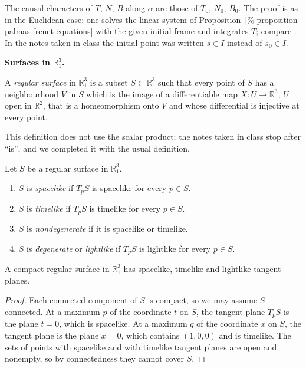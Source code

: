 The causal characters of $T$, $N$, $B$
along $\alpha$ are those of $T_0$, $N_0$,
$B_0$. The proof is as in the Euclidean
case: one solves the linear system of
Proposition~\ref{%
proposition-palmas-frenet-equations}
with the given initial frame and integrates
$T$; compare \cite[Theorems 2.6 and
2.8]{lopez2014differential}. In the notes
taken in class the initial point was
written $s\in I$ instead of $s_0\in I$.

\medskip\noindent
{\bf Surfaces in $\mathbb{R}^3_1$.}

\begin{definition}
\label{definition-palmas-regular-surface}
A \emph{regular surface} in
$\mathbb{R}^3_1$ is a subset
$S\subset\mathbb{R}^3$ such that every
point of $S$ has a neighbourhood $V$ in
$S$ which is the image of a differentiable
map $X\colon U\to\mathbb{R}^3$, $U$ open in
$\mathbb{R}^2$, that is a homeomorphism
onto $V$ and whose differential is
injective at every point.
\end{definition}

This definition does not use the scalar
product; the notes taken in class stop
after ``is'', and we completed it with the
usual definition.

\begin{definition}
\label{definition-palmas-causal-surface}
Let $S$ be a regular surface in
$\mathbb{R}^3_1$.
\begin{enumerate}
\item $S$ is \emph{spacelike} if $T_pS$ is
spacelike for every $p\in S$.
\item $S$ is \emph{timelike} if $T_pS$ is
timelike for every $p\in S$.
\item $S$ is \emph{nondegenerate} if it is
spacelike or timelike.
\item $S$ is \emph{degenerate} or
\emph{lightlike} if $T_pS$ is lightlike
for every $p\in S$.
\end{enumerate}
\end{definition}

\begin{proposition}
\label{proposition-palmas-compact-surface}
A compact regular surface in
$\mathbb{R}^3_1$ has spacelike, timelike
and lightlike tangent planes.
\end{proposition}

\begin{proof}
Each connected component of $S$ is
compact, so we may assume $S$ connected.
At a maximum $p$ of the coordinate $t$ on
$S$, the tangent plane $T_pS$ is the plane
$t=0$, which is spacelike. At a maximum
$q$ of the coordinate $x$ on $S$, the
tangent plane is the plane $x=0$, which
contains $(1,0,0)$ and is timelike. The
sets of points with spacelike and with
timelike tangent planes are open and
nonempty, so by connectedness they cannot
cover $S$.
\end{proof}

